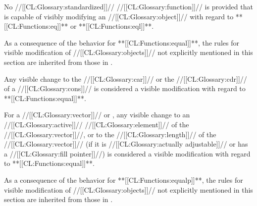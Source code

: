 No //[[CL:Glossary:standardized]]// //[[CL:Glossary:function]]// is provided that is capable of visibly
modifying an //[[CL:Glossary:object]]// with regard to **[[CL:Functions:eq]]** or **[[CL:Functions:eql]]**.

\endsubsubsection%


As a consequence of the behavior for **[[CL:Functions:equal]]**,
the rules for visible modification of //[[CL:Glossary:objects]]// not explicitly mentioned in this
section are inherited from those in \secref\VisModEQL.
 

Any visible change to the //[[CL:Glossary:car]]// or the //[[CL:Glossary:cdr]]// of a //[[CL:Glossary:cons]]//
is considered a visible modification with regard to **[[CL:Functions:equal]]**.
 
\endsubsubsubsection%


For a //[[CL:Glossary:vector]]//  or , any visible change
     to an //[[CL:Glossary:active]]// //[[CL:Glossary:element]]// of the //[[CL:Glossary:vector]]//,
  or to the //[[CL:Glossary:length]]// of the //[[CL:Glossary:vector]]// (if it is //[[CL:Glossary:actually adjustable]]// 
					           or has a //[[CL:Glossary:fill pointer]]//)
is considered a visible modification with regard to **[[CL:Functions:equal]]**.
 
\endsubsubsubsection%

\endsubsubsection%


As a consequence of the behavior for **[[CL:Functions:equalp]]**,
the rules for visible modification of //[[CL:Glossary:objects]]// not explicitly mentioned in this
section are inherited from those in \secref\VisModEQUAL.


